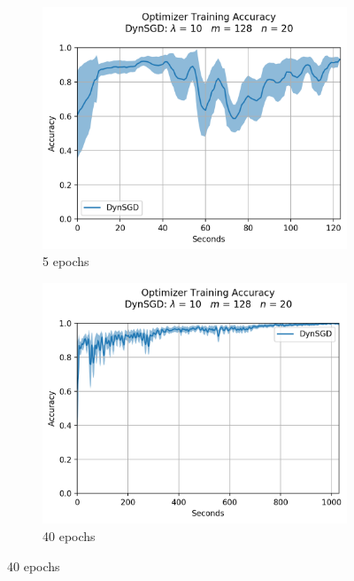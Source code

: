 \begin{figure}[H]
  \centering
  \begin{subfigure}{0.49\textwidth}
    \centering
    \includegraphics[width=\linewidth]{resources/images/dynsgd_20_10}
    \caption{5 epochs}
  \end{subfigure}
  \begin{subfigure}{0.49\textwidth}
    \centering
    \includegraphics[width=\linewidth]{resources/images/dynsgd_20_10_fair}
    \caption{40 epochs}
  \end{subfigure}

\end{figure}
